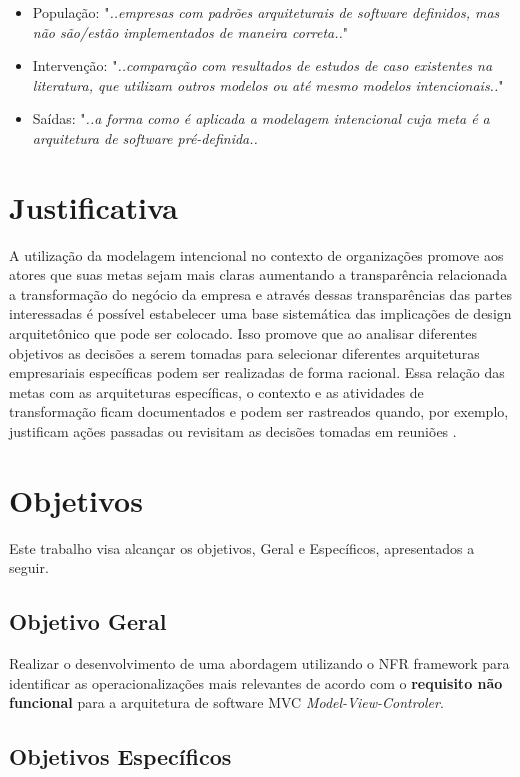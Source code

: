 \begin{itemize}
	\item População: "\textit{..empresas com padrões arquiteturais de software definidos, mas não são/estão implementados de maneira correta..}"
	\item Intervenção: "\textit{..comparação com resultados de estudos de caso existentes na literatura, que utilizam outros modelos ou até mesmo modelos intencionais..}"
	\item Saídas: "\textit{..a forma como é aplicada a modelagem intencional cuja meta é a arquitetura de software pré-definida..}
\end{itemize}
\section{Justificativa}

A utilização da modelagem intencional no contexto de organizações promove aos atores que suas metas sejam mais claras aumentando a transparência relacionada a transformação do negócio da empresa e através dessas transparências das partes interessadas é possível estabelecer uma base sistemática das implicações de design arquitetônico que pode ser colocado. Isso promove que ao analisar diferentes objetivos as decisões a serem tomadas para selecionar diferentes arquiteturas empresariais específicas podem ser realizadas de forma racional. Essa relação das metas com as arquiteturas específicas, o contexto e as atividades de transformação ficam documentados  e podem ser rastreados quando, por exemplo, justificam ações passadas ou revisitam as decisões tomadas em reuniões \cite{yu2006exploring}.

\section{Objetivos}

Este trabalho visa alcançar os objetivos, Geral e Específicos, apresentados a seguir.  

\subsection{Objetivo Geral}

Realizar o desenvolvimento de uma abordagem utilizando o NFR framework para identificar as operacionalizações mais relevantes de acordo com o \textbf{requisito não funcional} para a arquitetura de software MVC \textit{Model-View-Controler}. 

\subsection{Objetivos Específicos}

